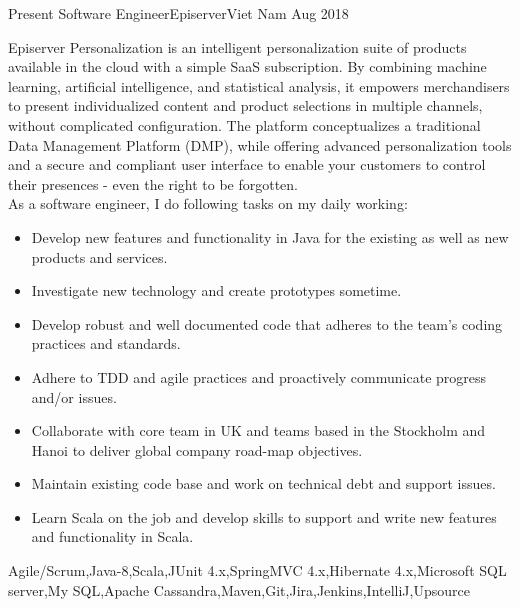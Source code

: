 %
%
%
\begin{experiences}
\experience
  {Present}  {Software Engineer}{Episerver}{Viet Nam}
  {Aug 2018}  {  
Episerver Personalization is an intelligent personalization suite of products available in the cloud with a simple SaaS subscription. By combining machine learning, artificial intelligence, and statistical analysis, it empowers merchandisers to present individualized content and product selections in multiple channels, without complicated configuration. The platform conceptualizes a traditional Data Management Platform (DMP), while offering advanced personalization tools and a secure and compliant user interface to enable your customers to control their presences - even the right to be forgotten.\\
As a software engineer, I do following tasks on my daily working:
	\begin{itemize}
        \item Develop new features and functionality in Java for the existing as well as new products and services.       
        \item Investigate new technology and create prototypes sometime.                         
        \item Develop robust and well documented code that adheres to the team’s coding practices and standards.
        \item Adhere to TDD and agile practices and proactively communicate progress and/or issues.       
        \item Collaborate with core team in UK and teams based in the Stockholm and Hanoi to deliver global company road-map objectives.        
        \item Maintain existing code base and work on technical debt and support issues.
        \item Learn Scala on the job and develop skills to support and write new features and functionality in Scala.
	\end{itemize}
}
{Agile/Scrum,Java-8,Scala,JUnit 4.x,SpringMVC 4.x,Hibernate 4.x,Microsoft SQL server,My SQL,Apache Cassandra,Maven,Git,Jira,Jenkins,IntelliJ,Upsource}
\emptySeparator


\end{experiences}

